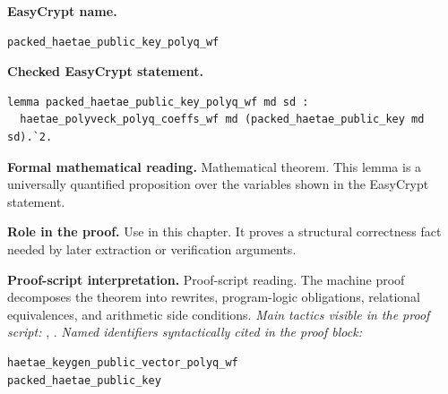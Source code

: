 \begin{formaltheorem}
\noindent\textbf{EasyCrypt name.}
\begin{lstlisting}[language=EasyCrypt,basicstyle=\ttfamily\scriptsize]
packed_haetae_public_key_polyq_wf
\end{lstlisting}
\noindent\textbf{Checked EasyCrypt statement.}
\begin{lstlisting}[language=EasyCrypt,basicstyle=\ttfamily\scriptsize]
lemma packed_haetae_public_key_polyq_wf md sd :
  haetae_polyveck_polyq_coeffs_wf md (packed_haetae_public_key md sd).`2.
\end{lstlisting}
\noindent\textbf{Formal mathematical reading.}
Mathematical theorem. This lemma is a universally quantified proposition over the variables shown in the EasyCrypt statement.

\noindent\textbf{Role in the proof.}
Use in this chapter. It proves a structural correctness fact needed by later extraction or verification arguments.

\noindent\textbf{Proof-script interpretation.}
Proof-script reading. The machine proof decomposes the theorem into rewrites, program-logic obligations, relational equivalences, and arithmetic side conditions.
\emph{Main tactics visible in the proof script:} , .
\emph{Named identifiers syntactically cited in the proof block:}
\begin{lstlisting}[language=EasyCrypt,basicstyle=\ttfamily\scriptsize]
haetae_keygen_public_vector_polyq_wf
packed_haetae_public_key
\end{lstlisting}

\end{formaltheorem}

